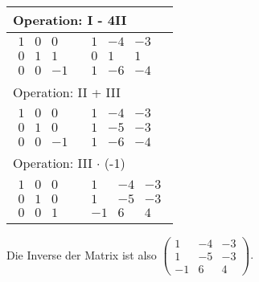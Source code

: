 \begin{longtable}{p{4cm}|p{3cm}}
    \multicolumn{2}{p{\dimexpr4cm+3cm+2\tabcolsep\relax}}{Operation: I - 4II}              \\\hline\pagebreak[0]

    $\displaystyle\begin{matrix}
                          1 & 0 & 0  \\
                          0 & 1 & 1  \\
                          0 & 0 & -1
                      \end{matrix}$         &
    $\displaystyle\begin{matrix}
                          1 & -4 & -3 \\
                          0 & 1  & 1  \\
                          1 & -6 & -4
                      \end{matrix}$                                                            \\\hline

    \multicolumn{2}{p{\dimexpr4cm+3cm+2\tabcolsep\relax}}{Operation: II + III}             \\\hline\pagebreak[0]

    $\displaystyle\begin{matrix}
                          1 & 0 & 0  \\
                          0 & 1 & 0  \\
                          0 & 0 & -1
                      \end{matrix}$         &
    $\displaystyle\begin{matrix}
                          1 & -4 & -3 \\
                          1 & -5 & -3 \\
                          1 & -6 & -4
                      \end{matrix}$                                                            \\\hline

    \multicolumn{2}{p{\dimexpr4cm+3cm+2\tabcolsep\relax}}{Operation: III $\cdot$ (-1)}     \\\hline\pagebreak[0]

    $\displaystyle\begin{matrix}
                          1 & 0 & 0 \\
                          0 & 1 & 0 \\
                          0 & 0 & 1
                      \end{matrix}$         &
    $\displaystyle\begin{matrix}
                          1  & -4 & -3 \\
                          1  & -5 & -3 \\
                          -1 & 6  & 4
                      \end{matrix}$                                                            \\\hline
\end{longtable}

Die Inverse der Matrix ist also $\begin{pmatrix}
        1  & -4 & -3 \\
        1  & -5 & -3 \\
        -1 & 6  & 4
    \end{pmatrix}.$